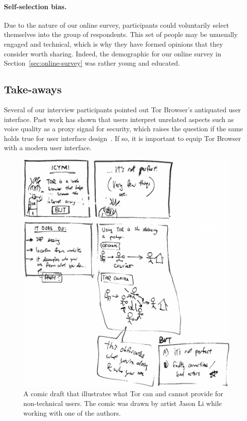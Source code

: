 \paragraph{Self-selection bias.}
Due to the nature of our online survey, participants could voluntarily select
themselves into the group of respondents.  This set of people may be unusually
engaged and technical, which is why they have formed opinions that they
consider worth sharing.  Indeed, the demographic for our online survey in
Section~\ref{sec:online-survey} was rather young and educated.

\subsection{Take-aways}
\label{sec:take-aways}

Several of our interview participants pointed out Tor Browser's antiquated user
interface.  Past work has shown that users interpret unrelated aspects such as
voice quality as a proxy signal for security, which raises the question if the
same holds true for user interface design~\cite[\S~IV.A]{Abu-Salma2017a}.  If
so, it is important to equip Tor Browser with a modern user interface.

\begin{figure}[t]
    \centering
    \includegraphics[width=\linewidth]{figures/tor-comic.jpg}
    \caption{A comic draft that illustrates what Tor can and cannot provide for
        non-technical users.  The comic was drawn by artist Jason Li while
        working with one of the authors.}
    \label{fig:tor-comic}
\end{figure}

